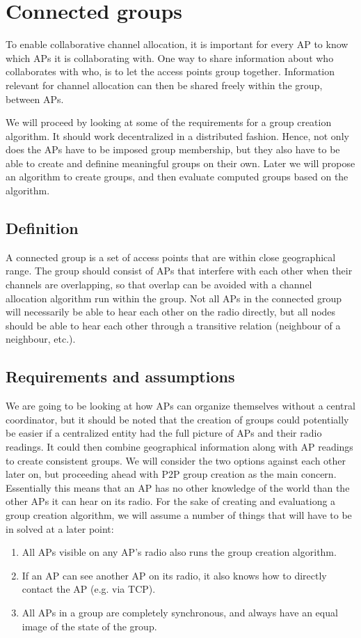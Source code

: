 \chapter{Connected groups}
To enable collaborative channel allocation, it is important for every AP to know which APs it is collaborating with.
One way to share information about who collaborates with who, is to let the access points group together. Information relevant for channel
allocation can then be shared freely within the group, between APs.

We will proceed by looking at some of the requirements for a group creation algorithm. It should work decentralized in a distributed fashion.
Hence, not only does the APs have to be imposed group membership, but they also have to be able to create and definine meaningful groups on their own.
Later we will propose an algorithm to create groups, and then evaluate computed groups based on the algorithm.


\section{Definition}
A connected group is a set of access points that are within close geographical range. The group should consist of APs that
interfere with each other when their channels are overlapping, so that overlap can be avoided with a channel allocation algorithm run within the group.
Not all APs in the connected group will necessarily be able to hear each other on the radio directly,
    but all nodes should be able to hear each other through a transitive relation (neighbour of a neighbour, etc.).

    \section{Requirements and assumptions}
    We are going to be looking at how APs can organize themselves without a central coordinator,
    but it should be noted that the creation of groups could potentially be easier if a centralized entity had the full picture of APs and their radio readings.
    It could then combine geographical information along with AP readings to create consistent groups.
    We will consider the two options against each other later on, but proceeding ahead with P2P group creation as the main concern. 
    Essentially this means that an AP has no other knowledge of the world than the other APs it can hear on its radio.
    For the sake of creating and evaluationg a group creation algorithm, we will assume a number of things that will have to be in solved at a later point:
    \begin{enumerate}
    \item All APs visible on any AP's radio also runs the group creation algorithm.
    \item If an AP can see another AP on its radio, it also knows how to directly contact the AP (e.g. via TCP).
    \item All APs in a group are completely synchronous, and always have an equal image of the state of the group. 
    \end{enumerate}

